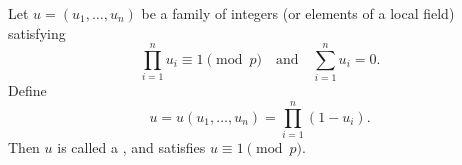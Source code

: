 Let $u = (u_1, \dots, u_n)$ be a family of integers (or elements of a local field) satisfying
$$\prod_{i=1}^{n} u_i \equiv 1 \pmod{p} \quad \text{and} \quad \sum_{i=1}^{n} u_i = 0.$$
Define
$$u = u(u_1, \dots, u_n) = \prod_{i=1}^{n} (1 - u_i).$$
Then $u$ is called a , and satisfies $u \equiv 1 \pmod{p}$.
